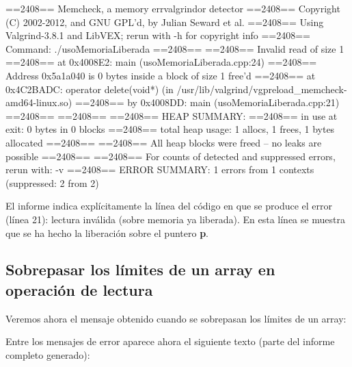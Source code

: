 \documentclass[11pt,a4paper,professionalfonts]{article}
\begin{document}
\vspace{0.4cm}
\begin{javacode}
==2408== Memcheck, a memory errvalgrindor detector
==2408== Copyright (C) 2002-2012, and GNU GPL'd, by Julian Seward et al.
==2408== Using Valgrind-3.8.1 and LibVEX; rerun with -h for copyright info
==2408== Command: ./usoMemoriaLiberada
==2408== 
==2408== Invalid read of size 1
==2408==    at 0x4008E2: main (usoMemoriaLiberada.cpp:24)
==2408==  Address 0x5a1a040 is 0 bytes inside a block of size 1 free'd
==2408==    at 0x4C2BADC: operator delete(void*) (in /usr/lib/valgrind/vgpreload_memcheck-amd64-linux.so)
==2408==    by 0x4008DD: main (usoMemoriaLiberada.cpp:21)
==2408== 
==2408== 
==2408== HEAP SUMMARY:
==2408==     in use at exit: 0 bytes in 0 blocks
==2408==   total heap usage: 1 allocs, 1 frees, 1 bytes allocated
==2408== 
==2408== All heap blocks were freed -- no leaks are possible
==2408== 
==2408== For counts of detected and suppressed errors, rerun with: -v
==2408== ERROR SUMMARY: 1 errors from 1 contexts (suppressed: 2 from 2)
\end{javacode}
\vspace{0.4cm}

El informe indica explícitamente la línea del código en que se
produce el error (línea 21): lectura inválida (sobre memoria ya
liberada). En esta línea se muestra que se ha hecho la liberación
sobre el puntero \textbf{p}.


\subsection{Sobrepasar los límites de un array en operación de lectura}

Veremos ahora el mensaje obtenido cuando se sobrepasan los límites de un
array:



Entre los mensajes de error aparece ahora el siguiente texto (parte del informe
completo generado):
\end{document}
